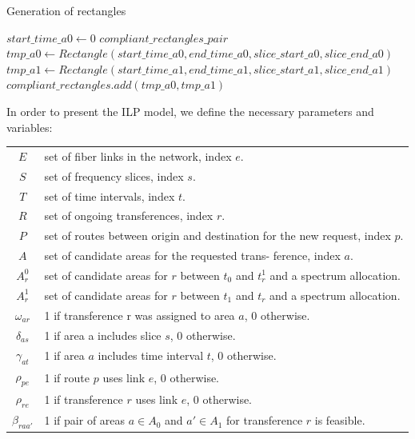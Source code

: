 \documentclass[11pt,a4paper]{article}
\begin{document}
\begin{algorithm}[H]
\caption{Generation of rectangles}\label{rectangles_precomputation}
\footnotesize
\begin{algorithmic}[1]
	\State $start\_time\_a0 \gets 0$
	\State $compliant\_rectangles\_pair$
				\State $tmp\_a0 \gets Rectangle(start\_time\_a0, end\_time\_a0,slice\_start\_a0,slice\_end\_a0)$
							\State $tmp\_a1 \gets Rectangle(start\_time\_a1, end\_time\_a1,slice\_start\_a1,slice\_end\_a1)$
								\State $compliant\_rectangles.add(tmp\_a0, tmp\_a1)$
							\EndIf
						\EndFor
					\EndFor		
				\EndFor
			\EndFor
		\EndFor		
	\EndFor
\EndProcedure
\end{algorithmic}
\end{algorithm}

In order to present the ILP model, we define the necessary parameters and variables:

\begin{table}[H]
\small
\begin{tabular}{c l}
$E$ & set of fiber links in the network, index $e$.\\
$S$ &  set of frequency slices, index $s$.\\
$T$ & set of time intervals, index $t$.\\
$R$ & set of ongoing transferences, index $r$.\\
$P$ & set of routes between origin and destination for the new request, index $p$.\\
$A$ & set of candidate areas for the requested trans- ference, index $a$.\\
$A^{0}_{r}$ & set of candidate areas for $r$ between $t_{0}$ and $t^{1}_{r}$ and a spectrum allocation.\\
$A^{1}_{r}$ & set of candidate areas for $r$ between $t_{1}$ and $t_{r}$ and a spectrum allocation.\\
$\omega_{ar}$ & 1 if transference r was assigned to area $a$, 0 otherwise.\\
$\delta_{as}$ & 1 if area a includes slice $s$, 0 otherwise.\\
$\gamma_{at}$ & 1 if area $a$ includes time interval $t$, 0 otherwise.\\ 
$\rho_{pe}$ & 1 if route $p$ uses link $e$, 0 otherwise.\\
$\rho_{re}$ & 1 if transference $r$ uses link $e$, 0 otherwise.\\
$\beta_{raa'}$ & 1 if pair of areas $a \in A_{0}$ and $a' \in A_{1}$ for transference $r$ is feasible.\\
\end{tabular}
\end{table}
\end{document}

